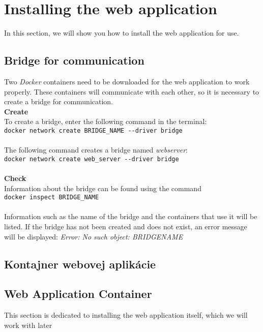 \section{Installing the web application}
In this section, we will show you how to install the web application for use.

\subsection{Bridge for communication}

Two \textit{Docker} containers need to be downloaded for the web application to work properly. These containers will communicate with each other, so it is necessary to create a bridge for communication.\\

\textbf{Create}\\
To create a bridge, enter the following command in the terminal:\\
\indent \verb|docker network create BRIDGE_NAME --driver bridge|\\\\
The following command creates a bridge named \textit{web\textunderscore server}:\\
\indent \verb|docker network create web_server --driver bridge|\\\\

\textbf{Check}\\
Information about the bridge can be found using the command\\
\indent \verb|docker inspect BRIDGE_NAME|\\\\
Information such as the name of the bridge and the containers that use it will be listed. If the bridge has not been created and does not exist, an error message will be displayed: \textit{Error: No such object: BRIDGE\textunderscore NAME}

\subsection{Kontajner webovej aplikácie}

\subsection{Web Application Container}

This section is dedicated to installing the web application itself, which we will work with later\\

